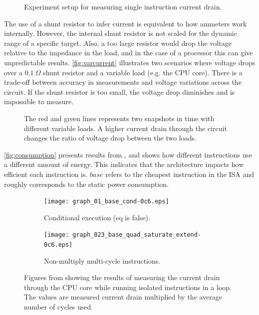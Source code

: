 \begin{figure}[bth]
    \centering
    
    \caption{Experiment setup for measuring single instruction current drain.}
    \label{fig:setup}
\end{figure}

The use of a shunt resistor to infer current is equivalent to how ammeters work
internally. However, the internal shunt resistor is not scaled for the dynamic
range of a specific target. Also, a too large resistor would drop the voltage
relative to the impedance in the load, and in the case of a processor this can
give unpredictable results. \autoref{fig:varcurrent} illustrates two scenarios
where voltage drops over a $0.1~\Omega$ shunt resistor and a variable load (e.g.
the CPU core). There is a trade-off between accuracy in measurements and voltage
variations across the circuit. If the shunt resistor is too small, the voltage
drop diminishes and is impossible to measure.

\begin{figure}[tbh]
    \centering
    
    \caption{The red and green lines represents two snapshots in time with
    different variable loads. A higher current drain through the circuit
    changes the ratio of voltage drop between the two loads.}
    \label{fig:varcurrent}
\end{figure}

\autoref{fig:consumption} presents results from \cite{rundehvatum2013exploring},
and shows how different instructions use a different amount of energy. This
indicates that the architecture impacts how efficient each instruction is.
$base$ refers to the cheapest instruction in the ISA and roughly corresponds to
the static power consumption.

\begin{figure}[tbh]
    \begin{subfigure}[b]{0.48\textwidth}
        \texttt{[image: graph\_01\_base\_cond-0c6.eps]}
        \caption{Conditional execution (eq is false).}
        \label{fig:consumptioncond}
    \end{subfigure}
    \begin{subfigure}[b]{0.52\textwidth}
        \texttt{[image: graph\_023\_base\_quad\_saturate\_extend-0c6.eps]}
        \caption{Non-multiply multi-cycle instructions.}
        \label{fig:consumptionmulti}
    \end{subfigure}
    \caption{Figures from \cite{rundehvatum2013exploring} showing the results of
        measuring the current drain through the CPU core while running isolated
        instructions in a loop. The values are measured current drain multiplied
        by the average number of cycles used.}
    \label{fig:consumption}
\end{figure}


